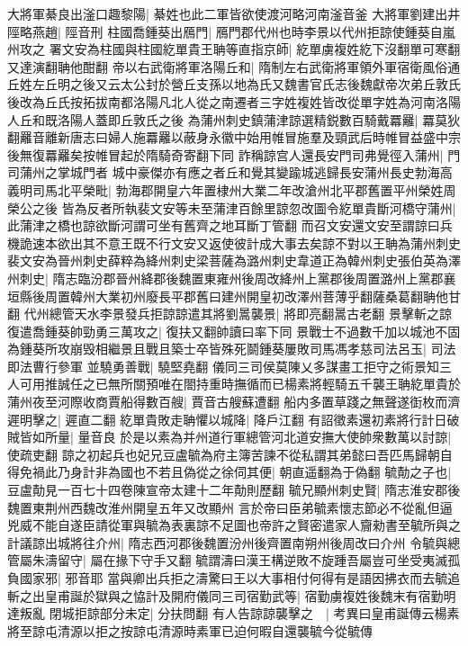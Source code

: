 大將軍綦良出滏口趣黎陽|{
	綦姓也此二軍皆欲使渡河略河南滏音釜}
大將軍劉建出井陘略燕趙|{
	陘音刑}
柱國喬鍾葵出鴈門|{
	鴈門郡代州也時李景以代州拒諒使鍾葵自嵐州攻之}
署文安為柱國與柱國紇單貴王聃等直指京師|{
	紇單虜複姓紇下沒翻單可寒翻又達演翻聃他酣翻}
帝以右武衛將軍洛陽丘和|{
	隋制左右武衛將軍領外軍宿衛風俗通丘姓左丘明之後又云太公封於營丘支孫以地為氏又魏書官氏志後魏獻帝次弟丘敦氏後改為丘氏按拓拔南都洛陽凡北人從之南遷者三字姓複姓皆改從單字姓為河南洛陽人丘和既洛陽人蓋即丘敦氏之後}
為蒲州刺史鎮蒲津諒選精鋭數百騎戴羃䍦|{
	羃莫狄翻䍦音離新唐志曰婦人施羃䍦以蔽身永徽中始用帷冒施羣及頸武后時帷冒益盛中宗後無復羃䍦矣按帷冒起於隋騎奇寄翻下同}
詐稱諒宫人還長安門司弗覺徑入蒲州|{
	門司蒲州之掌城門者}
城中豪傑亦有應之者丘和覺其變踰城逃歸長安蒲州長史勃海高義明司馬北平榮毗|{
	勃海郡開皇六年置棣州大業二年改滄州北平郡舊置平州榮姓周榮公之後}
皆為反者所執裴文安等未至蒲津百餘里諒忽改圖令紇單貴斷河橋守蒲州|{
	此蒲津之橋也諒欲斷河謂可坐有舊齊之地耳斷丁管翻}
而召文安還文安至謂諒曰兵機詭速本欲出其不意王既不行文安又返使彼計成大事去矣諒不對以王聃為蒲州刺史裴文安為晉州刺史薛粹為絳州刺史梁菩薩為潞州刺史韋道正為韓州刺史張伯英為澤州刺史|{
	隋志臨汾郡晉州絳郡後魏置東雍州後周改絳州上黨郡後周置潞州上黨郡襄垣縣後周置韓州大業初州廢長平郡舊曰建州開皇初改澤州菩薄乎翻薩桑葛翻聃他甘翻}
代州總管天水李景發兵拒諒諒遣其將劉暠襲景|{
	將即亮翻暠古老翻}
景擊斬之諒復遣喬鍾葵帥勁勇三萬攻之|{
	復扶又翻帥讀曰率下同}
景戰士不過數千加以城池不固為鍾葵所攻崩毁相繼景且戰且築士卒皆殊死鬬鍾葵屢敗司馬馮孝慈司法呂玉|{
	司法即法曹行參軍}
並驍勇善戰|{
	驍堅堯翻}
儀同三司侯莫陳乂多謀畫工拒守之術景知三人可用推誠任之已無所關預唯在閤持重時撫循而已楊素將輕騎五千襲王聃紇單貴於蒲州夜至河際收商賈船得數百艘|{
	賈音古艘蘇遭翻}
船内多置草踐之無聲遂衘枚而濟遲明擊之|{
	遲直二翻}
紇單貴敗走聃懼以城降|{
	降戶江翻}
有詔徵素還初素將行計日破賊皆如所量|{
	量音良}
於是以素為并州道行軍總管河北道安撫大使帥衆數萬以討諒|{
	使疏吏翻}
諒之初起兵也妃兄豆盧毓為府主簿苦諫不從私謂其弟懿曰吾匹馬歸朝自得免禍此乃身計非為國也不若且偽從之徐伺其便|{
	朝直遥翻為于偽翻}
毓勣之子也|{
	豆盧勣見一百七十四卷陳宣帝太建十二年勣則歷翻}
毓兄顯州刺史賢|{
	隋志淮安郡後魏置東荆州西魏改淮州開皇五年又改顯州}
言於帝曰臣弟毓素懷志節必不從亂但逼兇威不能自遂臣請從軍與毓為表裏諒不足圖也帝許之賢密遣家人齎勑書至毓所與之計議諒出城將往介州|{
	隋志西河郡後魏置汾州後齊置南朔州後周改曰介州}
令毓與總管屬朱濤留守|{
	屬在掾下守手又翻}
毓謂濤曰漢王構逆敗不旋踵吾屬豈可坐受夷滅孤負國家邪|{
	邪音耶}
當與卿出兵拒之濤驚曰王以大事相付何得有是語因拂衣而去毓追斬之出皇甫誕於獄與之恊計及開府儀同三司宿勤武等|{
	宿勤虜複姓後魏末有宿勤明達叛亂}
閉城拒諒部分未定|{
	分扶問翻}
有人告諒諒襲擊之　|{
	考異曰皇甫誕傳云楊素將至諒屯清源以拒之按諒屯清源時素軍已迫何暇自還襲毓今從毓傳}
